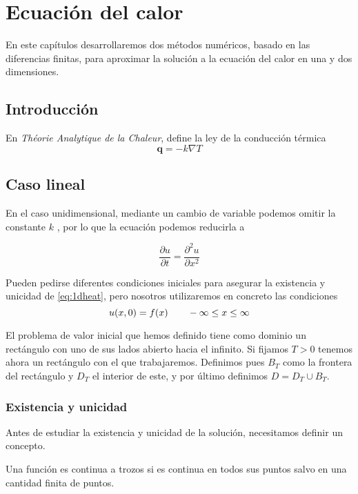 \chapter{Ecuación del calor}
\label{cap:heat}
\begin{resumen}
	En este capítulos desarrollaremos dos métodos numéricos, basado en las diferencias finitas, para aproximar la solución a la ecuación del calor en una  y dos dimensiones.
\end{resumen}

\section{Introducción}
En \emph{Théorie Analytique de la Chaleur}, \citeauthor{fourier} define la ley de la conducción térmica
\[
	\textbf{q}=-k\nabla T
\]

\section{Caso lineal}
En el caso unidimensional, mediante un cambio de variable podemos omitir la constante $k$ \citep[ver]{1dheat}, por lo que la ecuación podemos reducirla a

\begin{equation}\label{eq:1dheat}
	\frac{\partial u}{\partial t} = \frac{\partial ^2u}{\partial x^2}
\end{equation}

Pueden pedirse diferentes condiciones iniciales para asegurar la existencia y unicidad de \ref{eq:1dheat}, pero nosotros utilizaremos en concreto las condiciones
\begin{equation}
	u(x,0)=f(x) \hspace{20px} -\infty\leq x \leq \infty
\end{equation}

El problema de valor inicial que hemos definido tiene como dominio un rectángulo con uno de sus lados abierto hacia el infinito. Si fijamos $T>0$ tenemos ahora un rectángulo con el que trabajaremos. Definimos pues $B_T$ como la frontera del rectángulo y $D_T$ el interior de este, y por último definimos $D=D_T\cup B_T$.

\subsection{Existencia y unicidad}

Antes de estudiar la existencia y unicidad de la solución, necesitamos definir un concepto.
\begin{definicion}
	Una función es continua a trozos si es continua en todos sus puntos salvo en una cantidad finita de puntos.
\end{definicion}

